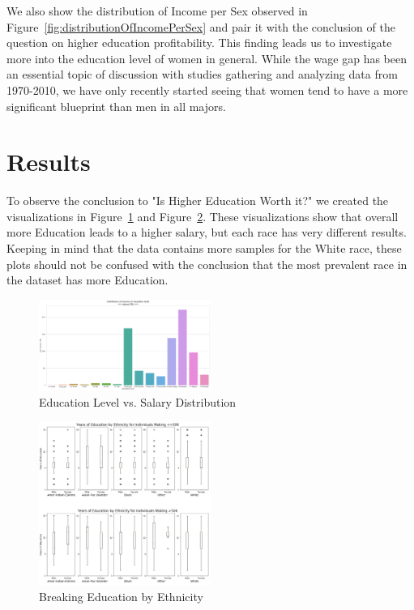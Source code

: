 \documentclass{IEEEtran}
\begin{document}
We also show the distribution of Income per Sex observed in Figure~\ref{fig:distributionOfIncomePerSex} and pair it with the conclusion of the question on higher education profitability. This finding leads us to investigate more into the education level of women in general. While the wage gap has been an essential topic of discussion with studies gathering and analyzing data from 1970-2010\cite{blau2017gender}, we have only recently started seeing that women tend to have a more significant blueprint than men in all majors\cite{hess_2019}. 

\section{Results}

To observe the conclusion to "Is Higher Education Worth it?" we created the visualizations in Figure~\ref{fig:DistrbutionOfEducationLevel} and Figure~\ref{fig:EducationByEthnicity}. These visualizations show that overall more Education leads to a higher salary, but each race has very different results. Keeping in mind that the data contains more samples for the White race, these plots should not be confused with the conclusion that the most prevalent race in the dataset has more Education.

\begin{figure}[!t]
  \centering
  \captionsetup{justification=centering}
  \includegraphics[width=0.5\textwidth]{EducationLevelVsSalary.png}%
  \caption{Education Level vs. Salary Distribution}%
  \label{fig:DistrbutionOfEducationLevel}%
\end{figure}

\begin{figure}[!t]
  \centering
  \captionsetup{justification=centering}
  \includegraphics[width=0.5\textwidth]{YearsOfEducationByEthnicity.png}%
  \caption{Breaking Education by Ethnicity}%
  \label{fig:EducationByEthnicity}%
\end{figure}
\end{document}
